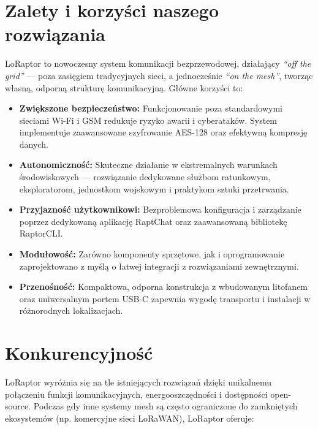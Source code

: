 \section{Zalety i korzyści naszego rozwiązania}

LoRaptor to nowoczesny system komunikacji bezprzewodowej, działający \textit{``off the grid''} --- poza zasięgiem tradycyjnych sieci, a jednocześnie \textit{``on the mesh''}, tworząc własną, odporną strukturę komunikacyjną. Główne korzyści to:

\begin{itemize}
	\item \textbf{Zwiększone bezpieczeństwo:} Funkcjonowanie poza standardowymi sieciami Wi-Fi i GSM redukuje ryzyko awarii i cyberataków. System implementuje zaawansowane szyfrowanie AES-128 oraz efektywną kompresję danych.
		
	\item \textbf{Autonomiczność:} Skuteczne działanie w ekstremalnych warunkach środowiskowych — rozwiązanie dedykowane służbom ratunkowym, eksploratorom, jednostkom wojskowym i praktykom sztuki przetrwania.
		
	\item \textbf{Przyjazność użytkownikowi:} Bezproblemowa konfiguracja i zarządzanie poprzez dedykowaną aplikację RaptChat oraz zaawansowaną bibliotekę RaptorCLI.
		
	\item \textbf{Modułowość:} Zarówno komponenty sprzętowe, jak i oprogramowanie zaprojektowano z myślą o łatwej integracji z rozwiązaniami zewnętrznymi.
		
	\item \textbf{Przenośność:} Kompaktowa, odporna konstrukcja z wbudowanym litofanem oraz uniwersalnym portem USB-C zapewnia wygodę transportu i instalacji w różnorodnych lokalizacjach.
\end{itemize}

\clearpage
\section{Konkurencyjność}

LoRaptor wyróżnia się na tle istniejących rozwiązań dzięki unikalnemu połączeniu funkcji komunikacyjnych, energooszczędności i dostępności open-source. Podczas gdy inne systemy mesh są często ograniczone do zamkniętych ekosystemów (np. komercyjne sieci LoRaWAN), LoRaptor oferuje:

